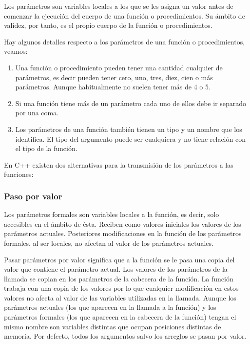 Los parámetros son variables locales a los que se les asigna un valor antes de comenzar la ejecución del cuerpo de una función o procedimientos. Su ámbito de validez, por tanto, es el propio cuerpo de la función o procedimientos. 

Hay algunos detalles respecto a los parámetros de una función o procedimientos, veamos:

\begin{enumerate}
	\item Una función o procedimiento pueden tener una cantidad cualquier de parámetros, es decir pueden tener cero, uno, tres, diez, cien o más parámetros. Aunque habitualmente no suelen tener más de 4 o 5.
	\item Si una función tiene más de un parámetro cada uno de ellos debe ir separado por una coma.
	\item Los parámetros de una función también tienen un tipo y un nombre que los identifica. El tipo del argumento puede ser cualquiera y no tiene relación con el tipo de la función.
\end{enumerate}

En C++ existen dos alternativas para la transmisión de los parámetros a las funciones:

\subsubsection{Paso por valor}

Los parámetros formales son variables locales a la función, es decir, solo accesibles en el ámbito de ésta. Reciben como valores iniciales los valores de los parámetros actuales. Posteriores modificaciones en la función de los parámetros formales, al ser locales, no afectan al valor de los parámetros actuales.

Pasar parámetros por valor significa que a la función se le pasa una copia del valor que contiene el parámetro actual. Los valores de los parámetros de la llamada se copian en los parámetros de la cabecera de la función. La función trabaja con una copia de los valores por lo que cualquier modificación en estos valores no afecta al valor de las variables utilizadas en la llamada. Aunque los parámetros actuales (los que aparecen en la llamada a la función) y los parámetros formales (los que aparecen en la cabecera de la función) tengan el mismo nombre son variables distintas que ocupan posiciones distintas de memoria. Por defecto, todos los argumentos salvo los arreglos se pasan por valor. 

